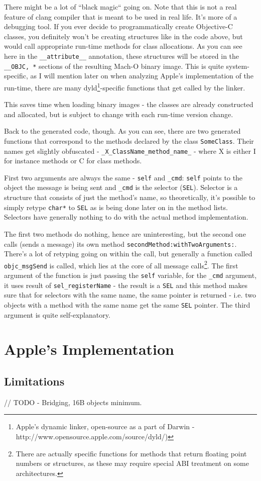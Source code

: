 \documentclass[a4paper, 11pt, fleqn]{book}
\begin{document}
There might be a lot of ``black magic`` going on. Note that this is not a real feature of clang compiler that is meant to be used in real life. It's more of a debugging tool. If you ever decide to programmatically create Objective-C classes, you definitely won't be creating structures like in the code above, but would call appropriate run-time methods for class allocations. As you can see here in the \verb=__attribute__= annotation, these structures will be stored in the \verb=__OBJC, *= sections of the resulting Mach-O binary image. This is quite system-specific, as I will mention later on when analyzing Apple's implementation of the run-time, there are many dyld\footnote{Apple's dynamic linker, open-source as a part of Darwin - http://www.opensource.apple.com/source/dyld/)}-specific functions that get called by the linker.

This saves time when loading binary images - the classes are already constructed and allocated, but is subject to change with each run-time version change.

Back to the generated code, though. As you can see, there are two generated functions that correspond to the methods declared by the class \verb=SomeClass=. Their names get slightly obfuscated - \verb=_X_ClassName_method_name_= - where X is either I for instance methods or C for class methods.

First two arguments are always the same - \verb=self= and \verb=_cmd=: \verb=self= points to the object the message is being sent and \verb=_cmd= is the selector (\verb=SEL=). Selector is a structure that consists of just the method's name, so theoretically, it's possible to simply retype \verb=char*= to \verb=SEL= as is being done later on in the method lists. Selectors have generally nothing to do with the actual method implementation.

The first two methods do nothing, hence are uninteresting, but the second one calls (sends a message) its own method \verb=secondMethod:withTwoArguments:=. There's a lot of retyping going on within the call, but generally a function called \verb=objc_msgSend= is called, which lies at the core of all message calls\footnote{There are actually specific functions for methods that return floating point numbers or structures, as these may require special ABI treatment on some architectures.}. The first argument of the function is just passing the \verb=self= variable, for the \verb=_cmd= argument, it uses result of \verb=sel_registerName= - the result is a \verb=SEL= and this method makes sure that for selectors with the same name, the same pointer is returned - i.e. two objects with a method with the same name get the same \verb=SEL= pointer. The third argument is quite self-explanatory.


\chapter{Apple's Implementation}
\section{Limitations}
// TODO
- Bridging, 16B objects minimum.
\end{document}
